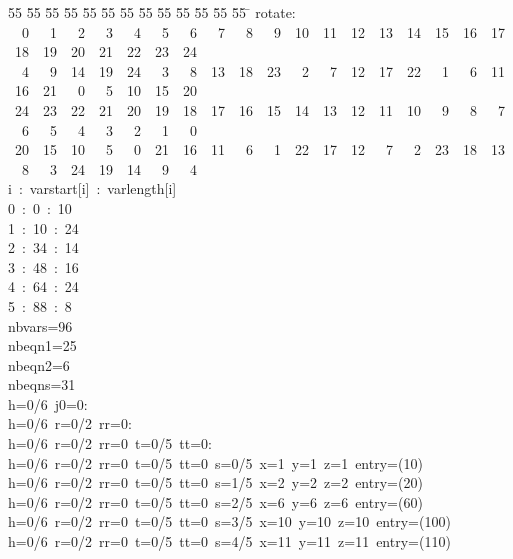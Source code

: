 %
%
\begin{tabbing}
55 \= 55 \= 55 \= 55 \= 55 \= 55 \= 55 \= 55 \= 55 \= 55 \= 55 \= 55 \= 55 \= \kill
rotate:\\[0pt]
\ \ 0\ \ \ 1\ \ \ 2\ \ \ 3\ \ \ 4\ \ \ 5\ \ \ 6\ \ \ 7\ \ \ 8\ \ \ 9\ \ 10\ \ 11\ \ 12\ \ 13\ \ 14\ \ 15\ \ 16\ \ 17\ \ 18\ \ 19\ \ 20\ \ 21\ \ 22\ \ 23\ \ 24\ \\[0pt]
\ \ 4\ \ \ 9\ \ 14\ \ 19\ \ 24\ \ \ 3\ \ \ 8\ \ 13\ \ 18\ \ 23\ \ \ 2\ \ \ 7\ \ 12\ \ 17\ \ 22\ \ \ 1\ \ \ 6\ \ 11\ \ 16\ \ 21\ \ \ 0\ \ \ 5\ \ 10\ \ 15\ \ 20\ \\[0pt]
\ 24\ \ 23\ \ 22\ \ 21\ \ 20\ \ 19\ \ 18\ \ 17\ \ 16\ \ 15\ \ 14\ \ 13\ \ 12\ \ 11\ \ 10\ \ \ 9\ \ \ 8\ \ \ 7\ \ \ 6\ \ \ 5\ \ \ 4\ \ \ 3\ \ \ 2\ \ \ 1\ \ \ 0\ \\[0pt]
\ 20\ \ 15\ \ 10\ \ \ 5\ \ \ 0\ \ 21\ \ 16\ \ 11\ \ \ 6\ \ \ 1\ \ 22\ \ 17\ \ 12\ \ \ 7\ \ \ 2\ \ 23\ \ 18\ \ 13\ \ \ 8\ \ \ 3\ \ 24\ \ 19\ \ 14\ \ \ 9\ \ \ 4\ \\[0pt]
i\ :\ varstart[i]\ :\ varlength[i]\\[0pt]
0\ :\ 0\ :\ 10\\[0pt]
1\ :\ 10\ :\ 24\\[0pt]
2\ :\ 34\ :\ 14\\[0pt]
3\ :\ 48\ :\ 16\\[0pt]
4\ :\ 64\ :\ 24\\[0pt]
5\ :\ 88\ :\ 8\\[0pt]
nbvars=96\\[0pt]
nbeqn1=25\\[0pt]
nbeqn2=6\\[0pt]
nbeqns=31\\[0pt]
h=0/6\ j0=0:\\[0pt]
h=0/6\ r=0/2\ rr=0:\\[0pt]
h=0/6\ r=0/2\ rr=0\ t=0/5\ tt=0:\\[0pt]
h=0/6\ r=0/2\ rr=0\ t=0/5\ tt=0\ s=0/5\ x=1\ y=1\ z=1\ entry=(10)\\[0pt]
h=0/6\ r=0/2\ rr=0\ t=0/5\ tt=0\ s=1/5\ x=2\ y=2\ z=2\ entry=(20)\\[0pt]
h=0/6\ r=0/2\ rr=0\ t=0/5\ tt=0\ s=2/5\ x=6\ y=6\ z=6\ entry=(60)\\[0pt]
h=0/6\ r=0/2\ rr=0\ t=0/5\ tt=0\ s=3/5\ x=10\ y=10\ z=10\ entry=(100)\\[0pt]
h=0/6\ r=0/2\ rr=0\ t=0/5\ tt=0\ s=4/5\ x=11\ y=11\ z=11\ entry=(110)\\[0pt]

\end{tabbing}
